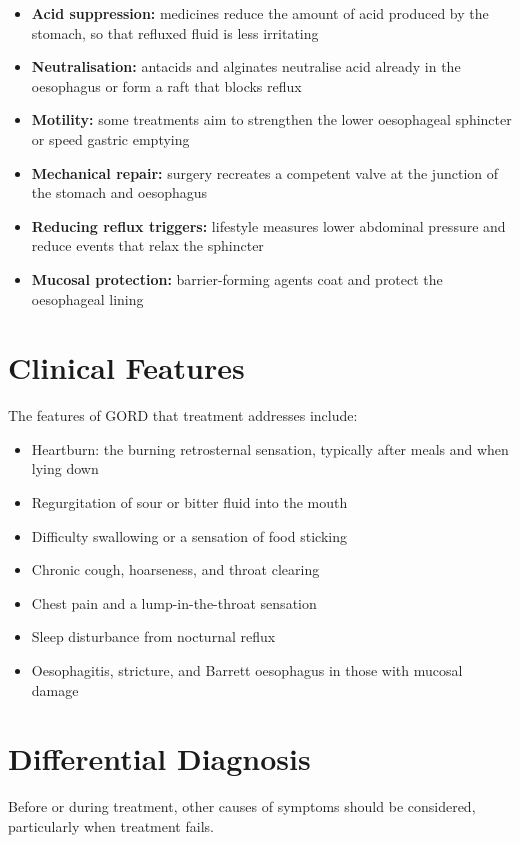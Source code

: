 \begin{itemize}
    \item \textbf{Acid suppression:} medicines reduce the amount of acid produced by the stomach, so that refluxed fluid is less irritating
    \item \textbf{Neutralisation:} antacids and alginates neutralise acid already in the oesophagus or form a raft that blocks reflux
    \item \textbf{Motility:} some treatments aim to strengthen the lower oesophageal sphincter or speed gastric emptying
    \item \textbf{Mechanical repair:} surgery recreates a competent valve at the junction of the stomach and oesophagus
    \item \textbf{Reducing reflux triggers:} lifestyle measures lower abdominal pressure and reduce events that relax the sphincter
    \item \textbf{Mucosal protection:} barrier-forming agents coat and protect the oesophageal lining
\end{itemize}

\section*{Clinical Features}
The features of GORD that treatment addresses include:

\begin{itemize}
    \item Heartburn: the burning retrosternal sensation, typically after meals and when lying down
    \item Regurgitation of sour or bitter fluid into the mouth
    \item Difficulty swallowing or a sensation of food sticking
    \item Chronic cough, hoarseness, and throat clearing
    \item Chest pain and a lump-in-the-throat sensation
    \item Sleep disturbance from nocturnal reflux
    \item Oesophagitis, stricture, and Barrett oesophagus in those with mucosal damage
\end{itemize}

\section*{Differential Diagnosis}
Before or during treatment, other causes of symptoms should be considered, particularly when treatment fails.

